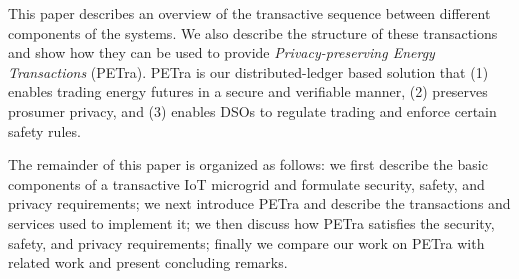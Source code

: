 This paper describes an overview of the transactive sequence between
different components of the systems. We also describe the structure of
these transactions and show how they can be used to provide
\emph{Privacy-preserving Energy Transactions} (PETra). PETra is our
distributed-ledger based solution that (1) enables trading energy
futures in a secure and verifiable manner, (2) preserves prosumer
privacy, and (3) enables DSOs to regulate trading and enforce certain
safety rules.

The remainder of this paper is organized as follows: we first describe
the basic components of a transactive IoT microgrid and formulate
security, safety, and privacy requirements; we next introduce PETra
and describe the transactions and services used to implement it; we
then discuss how PETra satisfies the security, safety, and privacy
requirements; finally we compare our work on PETra with related work
and present concluding remarks.

